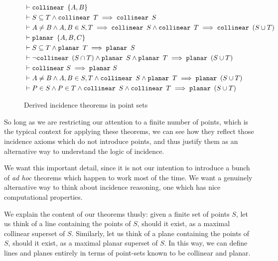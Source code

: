 \begin{figure}
\begin{align}
&\vdash\texttt{collinear}\ \, \{A,B\} \label{rule:colltwo}\\
&\vdash S \subseteq T \wedge \texttt{collinear}\ \, T \implies \texttt{collinear}\ \, S
  \label{rule:collsubset}\\
&\vdash A \neq B \wedge A,B \in S,T \implies \texttt{collinear}\ \, S \wedge \texttt{collinear}\ \, T \implies \texttt{collinear}\ \, (S \cup T) \label{rule:collunion}\\
&\vdash\texttt{planar}\ \, \{A,B,C\} \label{rule:planethree}\\
&\vdash S \subseteq T \wedge \texttt{planar}\ \, T \implies \texttt{planar}\ \, S
  \label{rule:planesubset}\\
&\vdash\neg\texttt{collinear}\ \, (S \cap T) \wedge \texttt{planar}\ \, S \wedge \texttt{planar}\ \, T \implies \texttt{planar}\ \, (S \cup T) \label{rule:planeunion}\\
&\vdash\texttt{collinear}\  S \implies \texttt{planar}\  S \label{rule:collplane}\\
&\vdash A \neq B \wedge A,B \in S,T \wedge \texttt{collinear}\ \, S \wedge \texttt{planar}\ \, T \implies \texttt{planar}\ \, (S \cup T) \label{rule:collplaneplane}\\
&\vdash P \in S \wedge P \in T \wedge \texttt{collinear}\ \, S \wedge \texttt{collinear}\ \, T \implies \texttt{planar}\ \, (S \cup T) \label{rule:collcollplane}
\end{align}
\caption{Derived incidence theorems in point sets}
\label{fig:PointSets}
\end{figure}

So long as we are restricting our attention to a finite number of points, which is the typical context for applying these theorems, we can see how they reflect those incidence axioms which do not introduce points, and thus justify them as an alternative way to understand the logic of incidence. 

We want this important detail, since it is not our intention to introduce a bunch of \emph{ad hoc} theorems which happen to work most of the time. We want a genuinely alternative way to think about incidence reasoning, one which has nice computational properties.

We explain the content of our theorems thusly: given a finite set of points $S$, let us think of a line containing the points of $S$, should it exist, as a maximal collinear superset of $S$. Similarly, let us think of a plane containing the points of $S$, should it exist, as a maximal planar superset of $S$. In this way, we can define lines and planes entirely in terms of point-sets known to be collinear and planar.

